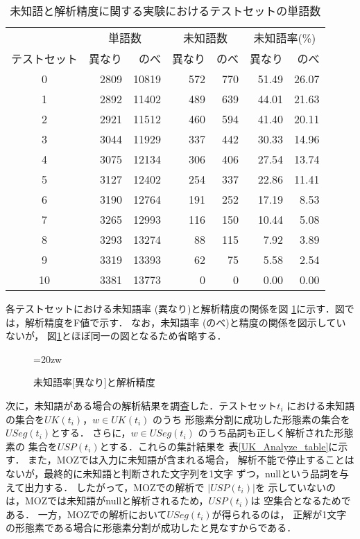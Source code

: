 \begin{table}[htb]
\begin{center}
\caption{未知語と解析精度に関する実験におけるテストセットの単語数}
\label{UkTEST}
\begin{tabular}{c|rrrrrr}
\hline
 & \multicolumn{2}{c}{単語数}&\multicolumn{2}{c}{未知語数} &
 \multicolumn{2}{c}{未知語率(\%)}\\
テストセット             & 異なり &のべ & 異なり &のべ & 異なり &のべ \\
\hline
0            & 2809 & 10819 & 572    & 770 & 51.49  &26.07\\ 
1            & 2892 & 11402 & 489    & 639 &44.01   &21.63\\ 
2            & 2921 & 11512 & 460    & 594 &41.40   &20.11\\ 
3            & 3044 & 11929 & 337    & 442 &30.33   &14.96\\ 
4            & 3075 & 12134 & 306    & 406 &27.54   &13.74\\ 
5            & 3127 & 12402 & 254    & 337 &22.86   &11.41\\ 
6            & 3190 & 12764 & 191    & 252 &17.19   &8.53\\ 
7            & 3265 & 12993 & 116    & 150 &10.44   &5.08\\ 
8            & 3293 & 13274 & 88     & 115 &7.92    &3.89\\ 
9            & 3319 & 13393 & 62     & 75  &5.58    &2.54\\ 
10           & 3381 & 13773 & 0      & 0   &0.00    &0.00\\ 
\hline
\end{tabular}
\end{center} 
\end{table}

各テストセットにおける未知語率 (異なり)と解析精度の関係を図
\ref{MorCrbyUk}に示す．図では，解析精度をF値で示す．
なお，未知語率 (のべ)と精度の関係を図示していないが，
図\ref{MorCrbyUk}とほぼ同一の図となるため省略する．


\begin{figure}[htb]
  \begin{center}
   \epsfxsize=20zw
   \caption{未知語率[異なり]と解析精度}
   \label{MorCrbyUk}
  \end{center}
\end{figure}


次に，未知語がある場合の解析結果を調査した．テストセット$t_i$
における未知語の集合を$UK(t_i)$，$w \in UK(t_i)$ のうち
形態素分割に成功した形態素の集合を$USeg(t_i)$とする．
さらに，$w \in USeg(t_i)$ のうち品詞も正しく解析された形態素の
集合を$USP(t_i)$とする．これらの集計結果を
表\ref{UK_Analyze_table}に示す．
また，MOZでは入力に未知語が含まれる場合，
解析不能で停止することはないが，最終的に未知語と判断された文字列を1文字
ずつ，nullという品詞を与えて出力する．
したがって，MOZでの解析で $|USP(t_i)|$を
示していないのは，MOZでは未知語がnullと解析されるため，$USP(t_i)$は
空集合となるためである．
一方，MOZでの解析において$USeg(t_i)$が得られるのは，
正解が1文字の形態素である場合に形態素分割が成功したと見なすからである．

